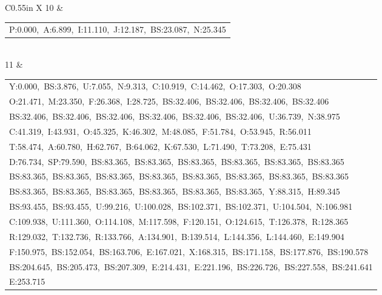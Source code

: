 \documentclass[10pt,a4paper]{article}
\begin{document}
\begin{center}
\begin{tabularx}{\textwidth}{
    C{0.55in}
    X
}
10 &
\begin{tabular}[t]{@{}l@{}}
P:0.000,\ A:6.899,\ I:11.110,\ J:12.187,\ BS:23.087,\ N:25.345
\end{tabular}
\\[0.12cm]

11 &
\begin{tabular}[t]{@{}l@{}}
Y:0.000,\ BS:3.876,\ U:7.055,\ N:9.313,\ C:10.919,\ C:14.462,\ O:17.303,\ O:20.308\\
O:21.471,\ M:23.350,\ F:26.368,\ I:28.725,\ BS:32.406,\ BS:32.406,\ BS:32.406,\ BS:32.406\\
BS:32.406,\ BS:32.406,\ BS:32.406,\ BS:32.406,\ BS:32.406,\ BS:32.406,\ U:36.739,\ N:38.975\\
C:41.319,\ I:43.931,\ O:45.325,\ K:46.302,\ M:48.085,\ F:51.784,\ O:53.945,\ R:56.011\\
T:58.474,\ A:60.780,\ H:62.767,\ B:64.062,\ K:67.530,\ L:71.490,\ T:73.208,\ E:75.431\\
D:76.734,\ SP:79.590,\ BS:83.365,\ BS:83.365,\ BS:83.365,\ BS:83.365,\ BS:83.365,\ BS:83.365\\
BS:83.365,\ BS:83.365,\ BS:83.365,\ BS:83.365,\ BS:83.365,\ BS:83.365,\ BS:83.365,\ BS:83.365\\
BS:83.365,\ BS:83.365,\ BS:83.365,\ BS:83.365,\ BS:83.365,\ BS:83.365,\ Y:88.315,\ H:89.345\\
BS:93.455,\ BS:93.455,\ U:99.216,\ U:100.028,\ BS:102.371,\ BS:102.371,\ U:104.504,\ N:106.981\\
C:109.938,\ U:111.360,\ O:114.108,\ M:117.598,\ F:120.151,\ O:124.615,\ T:126.378,\ R:128.365\\
R:129.032,\ T:132.736,\ R:133.766,\ A:134.901,\ B:139.514,\ L:144.356,\ L:144.460,\ E:149.904\\
F:150.975,\ BS:152.054,\ BS:163.706,\ E:167.021,\ X:168.315,\ BS:171.158,\ BS:177.876,\ BS:190.578\\
BS:204.645,\ BS:205.473,\ BS:207.309,\ E:214.431,\ E:221.196,\ BS:226.726,\ BS:227.558,\ BS:241.641\\
E:253.715
\end{tabular}
\\[0.12cm]


\end{tabularx}
\end{center}
\end{document}
